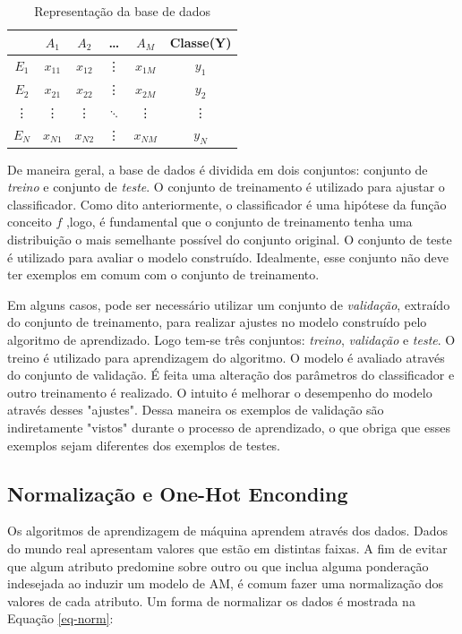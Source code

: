 \begin{table}[]
	\centering
	\begin{tabular}{c|cccc|c}
		\hline
		& $A_1$ & $A_2$ & \dots & $A_M$  & Classe(Y) \\
		\hline 
		\hline
		$E_1$ & $x_{11}$ & $x_{12}$ & \vdots & $x_{1M}$ & $y_1$ \\
		$E_2$ & $x_{21}$ & $x_{22}$ & \vdots & $x_{2M}$ & $y_2$ \\
		\vdots & \vdots & \vdots &  $\ddots$ & \vdots & \vdots \\
		$E_N$ & $x_{N1}$ & $x_{N2}$ & \vdots & $x_{NM}$ & $y_N$ \\
		\hline
		
		
	\end{tabular}	
	\caption{Representação da base de dados}
	\label{table-dataset}
\end{table}


De maneira geral, a base de dados é dividida em dois conjuntos: conjunto de \textit{treino} e conjunto de \textit{teste}. O conjunto de treinamento é utilizado para ajustar o classificador. Como dito anteriormente, o classificador é uma hipótese da função conceito $f$ ,logo, é fundamental que o conjunto de treinamento tenha uma distribuição o mais semelhante possível do conjunto original.  O conjunto de teste é utilizado para avaliar o modelo construído. Idealmente, esse conjunto não deve ter exemplos em comum com o conjunto de treinamento.

Em alguns casos, pode ser necessário utilizar um conjunto de \textit{validação}, extraído do conjunto de treinamento, para realizar ajustes no modelo construído pelo algoritmo de aprendizado. Logo tem-se três conjuntos: \textit{treino}, \textit{validação} e \textit{teste}. O treino é utilizado para aprendizagem do algoritmo. O modelo é avaliado através do conjunto de validação. É feita uma alteração dos parâmetros do classificador e outro treinamento é realizado. O intuito é melhorar o desempenho do modelo através desses "ajustes". Dessa maneira os exemplos de validação são indiretamente "vistos" durante o processo de aprendizado, o que obriga que esses exemplos sejam diferentes dos exemplos de testes.

\subsection{Normalização e One-Hot Enconding} \label{ssec:norm}
Os algoritmos de aprendizagem de máquina aprendem através dos dados. Dados do mundo real apresentam valores que estão em distintas faixas. A fim de evitar que algum atributo predomine sobre outro ou que inclua alguma ponderação indesejada ao induzir um modelo de AM, é comum fazer uma normalização dos valores de cada atributo. Um forma de normalizar os dados é mostrada na Equação \ref{eq-norm}:

